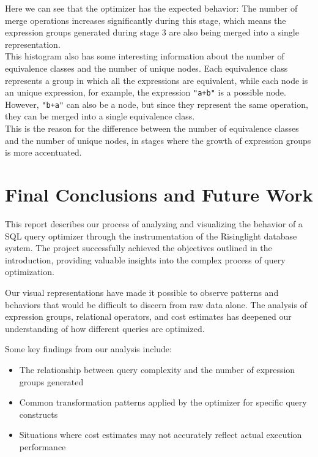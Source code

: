 \documentclass[a4paper,12pt]{scrreprt}
\begin{document}
Here we can see that the optimizer has the expected behavior: The number of merge operations increases significantly during this stage, which means the expression groups generated during stage 3 are also being merged into a single representation. \\

This histogram also has some interesting information about the number of equivalence classes and the number of unique nodes. Each equivalence class represents a group in which all the expressions are equivalent, while each node is an unique expression, for example, the expression \texttt{"a+b"} is a possible node.\\ 
However, \texttt{"b+a"} can also be a node, but since they represent the same operation, they can be merged into a single equivalence class. \\
This is the reason for the difference between the number of equivalence classes and the number of unique nodes, in stages where the growth of expression groups is more accentuated. \\


\chapter{Final Conclusions and Future Work} \label{chap:concl}
\thispagestyle{fancy}
This report describes our process of analyzing and visualizing the behavior of a SQL query optimizer through the instrumentation of the Risinglight database system. The project successfully achieved the objectives outlined in the introduction, providing valuable insights into the complex process of query optimization.

Our visual representations have made it possible to observe patterns and behaviors that would be difficult to discern from raw data alone. The analysis of expression groups, relational operators, and cost estimates has deepened our understanding of how different queries are optimized.

Some key findings from our analysis include:
\begin{itemize}
    \item The relationship between query complexity and the number of expression groups generated
    \item Common transformation patterns applied by the optimizer for specific query constructs
    \item Situations where cost estimates may not accurately reflect actual execution performance
\end{itemize}
\end{document}
